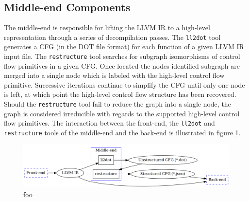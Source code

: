 \subsection{Middle-end Components}





The middle-end is responsible for lifting the LLVM IR to a high-level representation through a series of decompilation passes. The \texttt{ll2dot} tool generates a CFG (in the DOT file format) for each function of a given LLVM IR input file. The \texttt{restructure} tool searches for subgraph isomorphisms of control flow primitives in a given CFG. Once located the nodes identified subgraph are merged into a single node which is labeled with the high-level control flow primitive. Successive iterations continue to simplify the CFG until only one node is left, at which point the high-level control flow structure has been recovered. Should the \texttt{restructure} tool fail to reduce the graph into a single node, the graph is considered irreducible with regards to the supported high-level control flow primitives. The interaction between the front-end, the \texttt{ll2dot} and \texttt{restructure} tools of the middle-end and the back-end is illustrated in figure \ref{fig:middle-end}.

%

\begin{figure}[htbp]
	\begin{center}
		\includegraphics[width=\textwidth]{inc/middle-end.png}
		\caption{foo}
		\label{fig:middle-end}
	\end{center}
\end{figure}

